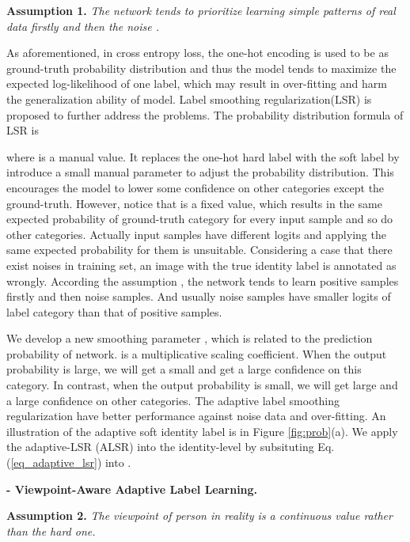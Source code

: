 \documentclass[letterpaper]{article} \usepackage{aaai20}  \usepackage{times}  \usepackage{helvet} \usepackage{courier}  \usepackage[hyphens]{url}  \usepackage{graphicx} \usepackage{array}
\begin{document}
{\bf Assumption 1.} \emph {The network tends to prioritize learning simple patterns of real data firstly and then the noise \cite{Arpit2017ACL}.}


As aforementioned, in cross entropy loss, the one-hot encoding is used to be as ground-truth probability distribution and thus the model tends to maximize the expected log-likelihood of one label, which may result in over-fitting and harm the generalization ability of model. Label smoothing regularization(LSR) \cite{Szegedy_2016_CVPR} is proposed to further address the problems. The probability distribution formula of LSR is
 
where  is a manual value. It replaces the one-hot hard label with the soft label by introduce a small manual parameter  to adjust the probability distribution. This encourages the model to lower some confidence on other categories except the ground-truth. However, notice that  is a fixed value, which results in the same expected probability of ground-truth category for every input sample and so do other categories. Actually input samples have different logits and applying the same expected probability for them is unsuitable. Considering a case that there exist noises in training set, an image  with the true identity label  is annotated as  wrongly. According the assumption \cite{Arpit2017ACL}, the network tends to learn positive samples firstly and then noise samples. And usually noise samples have smaller logits of label category than that of positive samples.
 


We develop a new smoothing parameter  , which is related to the prediction probability of network.  is a multiplicative scaling coefficient. When the output probability  is large, we will get a small  and get a large confidence on this category. In contrast, when the output probability  is small, we will get large  and a large confidence on other categories. The adaptive label smoothing regularization have better performance against noise data and over-fitting. An illustration of the adaptive soft identity label is in Figure \ref{fig:prob}(a). We apply the adaptive-LSR (ALSR) into the identity-level by subsituting Eq.(\ref{eq_adaptive_lsr}) into . 

\noindent \textbf{ - Viewpoint-Aware Adaptive Label Learning.}

{\bf Assumption 2.} \emph {The viewpoint of person in reality is a continuous value rather than the hard one. }
\end{document}
